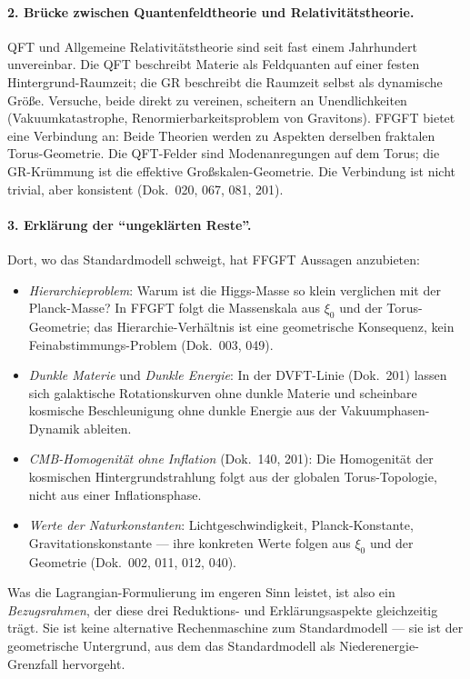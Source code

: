 \paragraph{2. Brücke zwischen Quantenfeldtheorie und Relativitätstheorie.}
QFT und Allgemeine Relativitätstheorie sind seit fast einem Jahrhundert
unvereinbar. Die QFT beschreibt Materie als Feldquanten auf einer
festen Hintergrund-Raumzeit; die GR beschreibt die Raumzeit selbst
als dynamische Größe. Versuche, beide direkt zu vereinen, scheitern
an Unendlichkeiten (Vakuumkatastrophe, Renormierbarkeitsproblem von
Gravitons). FFGFT bietet eine Verbindung an: Beide Theorien werden
zu Aspekten derselben fraktalen Torus-Geometrie. Die QFT-Felder sind
Modenanregungen auf dem Torus; die GR-Krümmung ist die effektive
Großskalen-Geometrie. Die Verbindung ist nicht trivial, aber
konsistent (Dok.~020, 067, 081, 201).

\paragraph{3. Erklärung der \enquote{ungeklärten Reste}.}
Dort, wo das Standardmodell schweigt, hat FFGFT Aussagen anzubieten:
\begin{itemize}\setlength\itemsep{0pt}
  \item \emph{Hierarchieproblem}: Warum ist die Higgs-Masse so klein
        verglichen mit der Planck-Masse? In FFGFT folgt die
        Massenskala aus $\xi_0$ und der Torus-Geometrie; das
        Hierarchie-Verhältnis ist eine geometrische Konsequenz, kein
        Feinabstimmungs-Problem (Dok.~003, 049).
  \item \emph{Dunkle Materie} und \emph{Dunkle Energie}: In der
        DVFT-Linie (Dok.~201) lassen sich galaktische Rotationskurven
        ohne dunkle Materie und scheinbare kosmische Beschleunigung
        ohne dunkle Energie aus der Vakuumphasen-Dynamik ableiten.
  \item \emph{CMB-Homogenität ohne Inflation} (Dok.~140, 201): Die
        Homogenität der kosmischen Hintergrundstrahlung folgt aus
        der globalen Torus-Topologie, nicht aus einer
        Inflationsphase.
  \item \emph{Werte der Naturkonstanten}: Lichtgeschwindigkeit,
        Planck-Konstante, Gravitationskonstante --- ihre konkreten
        Werte folgen aus $\xi_0$ und der Geometrie (Dok.~002, 011,
        012, 040).
\end{itemize}

Was die Lagrangian-Formulierung im engeren Sinn leistet, ist also
ein \emph{Bezugsrahmen}, der diese drei Reduktions- und
Erklärungsaspekte gleichzeitig trägt. Sie ist keine alternative
Rechenmaschine zum Standardmodell --- sie ist der geometrische
Untergrund, aus dem das Standardmodell als Niederenergie-Grenzfall
hervorgeht.

